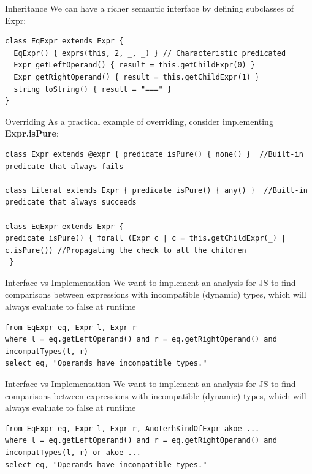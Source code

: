 \documentclass[usenames,dvipsnames]{beamer}
\begin{document}
\begin{frame}[fragile]{Inheritance}
We can have a richer semantic interface by defining subclasses of Expr:
\begin{lstlisting}[language=JastAdd]
class EqExpr extends Expr {
  EqExpr() { exprs(this, 2, _, _) } // Characteristic predicated
  Expr getLeftOperand() { result = this.getChildExpr(0) }
  Expr getRightOperand() { result = this.getChildExpr(1) }
  string toString() { result = "===" }
}
\end{lstlisting}
\end{frame}
%
\begin{frame}[fragile]{Overriding}
As a practical example of overriding, consider implementing \textbf{Expr.isPure}:
\begin{lstlisting}[language=JastAdd]
class Expr extends @expr { predicate isPure() { none() }  //Built-in predicate that always fails

class Literal extends Expr { predicate isPure() { any() }  //Built-in predicate that always succeeds

class EqExpr extends Expr {
predicate isPure() { forall (Expr c | c = this.getChildExpr(_) | c.isPure()) //Propagating the check to all the children
 }
\end{lstlisting}

\end{frame}
%
\begin{frame}[fragile]{Interface vs Implementation}
We want to implement an analysis for JS to ﬁnd comparisons between expressions with incompatible (dynamic) types, which will always evaluate to false at runtime

\begin{lstlisting}[language=JastAdd]
from EqExpr eq, Expr l, Expr r
where l = eq.getLeftOperand() and r = eq.getRightOperand() and incompatTypes(l, r)
select eq, "Operands have incompatible types."
\end{lstlisting}

\end{frame}

\begin{frame}[fragile]{Interface vs Implementation}
We want to implement an analysis for JS to ﬁnd comparisons between expressions with incompatible (dynamic) types, which will always evaluate to false at runtime

\begin{lstlisting}[language=JastAdd]
from EqExpr eq, Expr l, Expr r, AnoterhKindOfExpr akoe ...
where l = eq.getLeftOperand() and r = eq.getRightOperand() and incompatTypes(l, r) or akoe ...
select eq, "Operands have incompatible types."
\end{lstlisting}
\end{frame}
\end{document}
